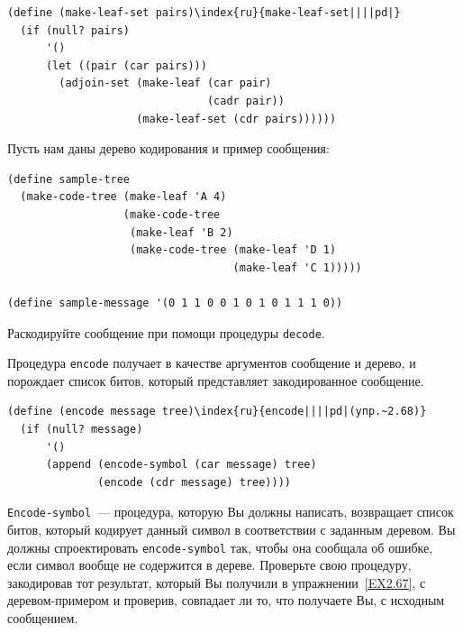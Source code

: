 \begin{Verbatim}[fontsize=\small]
(define (make-leaf-set pairs)\index{ru}{make-leaf-set||||pd|}
  (if (null? pairs)
      '()
      (let ((pair (car pairs)))
        (adjoin-set (make-leaf (car pair)
                               (cadr pair))
                    (make-leaf-set (cdr pairs))))))
\end{Verbatim}
\begin{exercise}{2.67}\label{EX2.67}%
Пусть нам даны дерево кодирования и пример сообщения:

\begin{Verbatim}[fontsize=\small]
(define sample-tree
  (make-code-tree (make-leaf 'A 4)
                  (make-code-tree
                   (make-leaf 'B 2)
                   (make-code-tree (make-leaf 'D 1)
                                   (make-leaf 'C 1)))))

(define sample-message '(0 1 1 0 0 1 0 1 0 1 1 1 0))
\end{Verbatim}
Раскодируйте сообщение при помощи процедуры {\tt decode}.
\end{exercise}
\begin{exercise}{2.68}\label{EX2.68}%
Процедура {\tt encode} получает в качестве
аргументов сообщение и дерево, и порождает список битов, который
представляет закодированное сообщение.

\begin{Verbatim}[fontsize=\small]
(define (encode message tree)\index{ru}{encode||||pd|(упр.~2.68)}
  (if (null? message)
      '()
      (append (encode-symbol (car message) tree)
              (encode (cdr message) tree))))
\end{Verbatim}
{\tt Encode-symbol}~--- процедура, которую Вы должны написать,
возвращает список битов, который кодирует данный символ в соответствии 
с заданным деревом.  Вы должны спроектировать
{\tt encode-symbol} так, чтобы она сообщала об ошибке, если
символ вообще не содержится в дереве.  Проверьте свою процедуру,
закодировав тот результат, который Вы получили в упражнении~\ref{EX2.67}, с деревом-примером и проверив,
совпадает ли то, что получаете Вы, с исходным сообщением.
\end{exercise}

